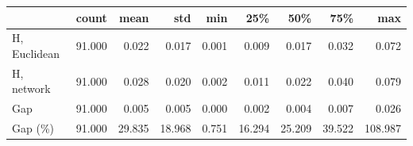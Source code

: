 \begin{tabular}{lrrrrrrrr}
\toprule
 & count & mean & std & min & 25\% & 50\% & 75\% & max \\
\midrule
H, Euclidean & 91.000 & 0.022 & 0.017 & 0.001 & 0.009 & 0.017 & 0.032 & 0.072 \\
H, network & 91.000 & 0.028 & 0.020 & 0.002 & 0.011 & 0.022 & 0.040 & 0.079 \\
Gap & 91.000 & 0.005 & 0.005 & 0.000 & 0.002 & 0.004 & 0.007 & 0.026 \\
Gap (\%) & 91.000 & 29.835 & 18.968 & 0.751 & 16.294 & 25.209 & 39.522 & 108.987 \\
\bottomrule
\end{tabular}
